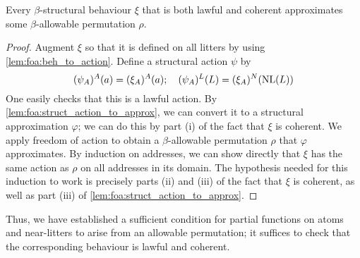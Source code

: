 \begin{theorem}
    \label{thm:foa_behaviour}
    Every \( \beta \)-structural behaviour \( \xi \) that is both lawful and coherent approximates some \( \beta \)-allowable permutation \( \rho \).
\end{theorem}
\begin{proof}
    Augment \( \xi \) so that it is defined on all litters by using \cref{lem:foa:beh_to_action}.
    Define a structural action \( \psi \) by
    \[ (\psi_A)^A(a) = (\xi_A)^A(a);\quad (\psi_A)^L(L) = (\xi_A)^N(\operatorname{NL}(L)) \]
    One easily checks that this is a lawful action.
    By \cref{lem:foa:struct_action_to_approx}, we can convert it to a structural approximation \( \varphi \); we can do this by part (i) of the fact that \( \xi \) is coherent.
    We apply freedom of action to obtain a \( \beta \)-allowable permutation \( \rho \) that \( \varphi \) approximates.
    By induction on addresses, we can show directly that \( \xi \) has the same action as \( \rho \) on all addresses in its domain.
    The hypothesis needed for this induction to work is precisely parts (ii) and (iii) of the fact that \( \xi \) is coherent, as well as part (iii) of \cref{lem:foa:struct_action_to_approx}.
\end{proof}

Thus, we have established a sufficient condition for partial functions on atoms and near-litters to arise from an allowable permutation; it suffices to check that the corresponding behaviour is lawful and coherent.
